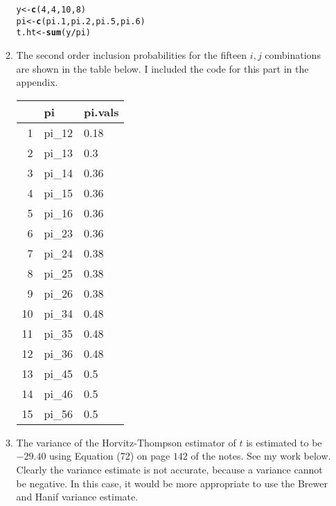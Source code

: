 \documentclass[12pt]{article}\usepackage[]{graphicx}\usepackage[]{color}
\makeatletter
\newcommand{\hlnum}[1]{\textcolor[rgb]{0.686,0.059,0.569}{#1}}%
\newcommand{\hlopt}[1]{\textcolor[rgb]{0,0,0}{#1}}%
\newcommand{\hlstd}[1]{\textcolor[rgb]{0.345,0.345,0.345}{#1}}%
\newcommand{\hlkwb}[1]{\textcolor[rgb]{0.69,0.353,0.396}{#1}}%
\newcommand{\hlkwd}[1]{\textcolor[rgb]{0.737,0.353,0.396}{\textbf{#1}}}%
\newenvironment{kframe}{%
 \def\at@end@of@kframe{}%
 \ifinner\ifhmode%
  \def\at@end@of@kframe{\end{minipage}}%
  \begin{minipage}{\columnwidth}%
 \fi\fi%
 \def\FrameCommand##1{\hskip\@totalleftmargin \hskip-\fboxsep
 \colorbox{shadecolor}{##1}\hskip-\fboxsep
     \hskip-\linewidth \hskip-\@totalleftmargin \hskip\columnwidth}%
 \MakeFramed {\advance\hsize-\width
   \@totalleftmargin\z@ \linewidth\hsize
   \@setminipage}}%
 {\par\unskip\endMakeFramed%
 \at@end@of@kframe}
\newenvironment{knitrout}{}{} %
\makeatother
\begin{document}
\begin{doublespacing}
\begin{enumerate}
\begin{enumerate}
\begin{singlespace}
\begin{knitrout}\footnotesize
{}\color{fgcolor}\begin{kframe}
\begin{alltt}
\hlstd{y} \hlkwb{<-} \hlkwd{c}\hlstd{(}\hlnum{4}\hlstd{,}\hlnum{4}\hlstd{,}\hlnum{10}\hlstd{,}\hlnum{8}\hlstd{)}
\hlstd{pi} \hlkwb{<-} \hlkwd{c}\hlstd{(pi.1, pi.2, pi.5, pi.6)}
\hlstd{t.ht} \hlkwb{<-} \hlkwd{sum}\hlstd{(y}\hlopt{/}\hlstd{pi)}
\end{alltt}
\end{kframe}
\end{knitrout}
\end{singlespace}

\item The second order inclusion probabilities for the fifteen $i, j$ combinations are shown in the table below. I included the code for this part in the appendix.

\begin{table}[ht]
\centering
\begin{tabular}{rll}
  \hline
 & pi & pi.vals \\ 
  \hline
1 & pi\_12 & 0.18 \\ 
  2 & pi\_13 & 0.3 \\ 
  3 & pi\_14 & 0.36 \\ 
  4 & pi\_15 & 0.36 \\ 
  5 & pi\_16 & 0.36 \\ 
  6 & pi\_23 & 0.36 \\ 
  7 & pi\_24 & 0.38 \\ 
  8 & pi\_25 & 0.38 \\ 
  9 & pi\_26 & 0.38 \\ 
  10 & pi\_34 & 0.48 \\ 
  11 & pi\_35 & 0.48 \\ 
  12 & pi\_36 & 0.48 \\ 
  13 & pi\_45 & 0.5 \\ 
  14 & pi\_46 & 0.5 \\ 
  15 & pi\_56 & 0.5 \\ 
   \hline
\end{tabular}
\end{table}


\item The variance of the Horvitz-Thompson estimator of $t$ is estimated to be $-29.40$ using Equation (72) on page $142$ of the notes. See my work below. Clearly the variance estimate is not accurate, because a variance cannot be negative. In this case, it would be more appropriate to use the Brewer and Hanif variance estimate.


\end{enumerate}
\end{enumerate}
\end{doublespacing}
\end{document}
